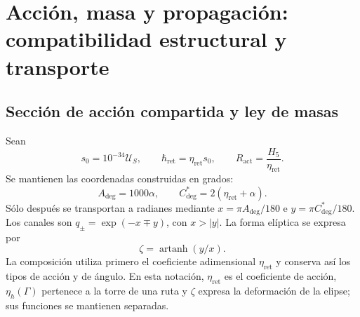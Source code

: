 \section{Acción, masa y propagación: compatibilidad estructural y transporte}
\label{md:hib:seccion}

\subsection{Sección de acción compartida y ley de masas}
\label{md:hib:accion-masas}

Sean
\begin{equation}
 s_0=10^{-34}\mathcal U_S,\qquad
 \hbar_{\mathrm{ret}}=\eta_{\mathrm{ret}}s_0,\qquad
 R_{\mathrm{act}}=\frac{H_5}{\eta_{\mathrm{ret}}}.
 \label{md:hib:accion}
\end{equation}
Se mantienen las coordenadas construidas en grados:
\begin{equation}
 A_{\deg}=1000\alpha,\qquad
 C^*_{\deg}=2(\eta_{\mathrm{ret}}+\alpha).
 \label{md:hib:angulos}
\end{equation}
Sólo después se transportan a radianes mediante
$x=\pi A_{\deg}/180$ e $y=\pi C^*_{\deg}/180$. Los canales son
$q_\pm=\exp(-x\mp y)$, con $x>|y|$. La forma elíptica se expresa por
\begin{equation}
 \zeta=\operatorname{artanh}(y/x).
 \label{md:hib:forma}
\end{equation}
La composición utiliza primero el coeficiente adimensional
$\eta_{\mathrm{ret}}$ y conserva así los tipos de acción y de ángulo.
En esta notación, $\eta_{\mathrm{ret}}$ es el coeficiente de acción,
$\eta_h(\Gamma)$ pertenece a la torre de una ruta y $\zeta$ expresa la
deformación de la elipse; sus funciones se mantienen separadas.


